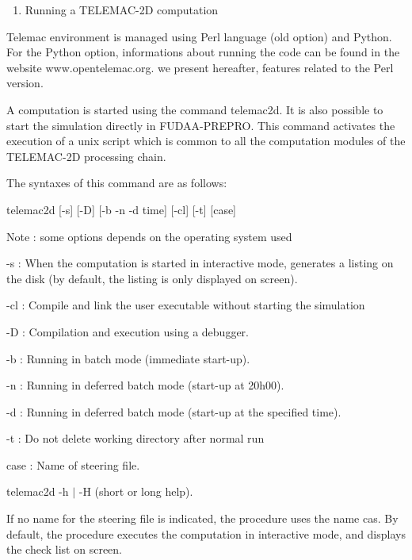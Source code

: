 





\begin{enumerate}
\item   Running a TELEMAC-2D computation
\end{enumerate}



 Telemac environment is managed using Perl language (old option) and Python. For the Python option, informations about running the code can be found in the website www.opentelemac.org. we present hereafter, features related to the Perl version.

 A computation is started using the command telemac2d. It is also possible to start the simulation directly in FUDAA-PREPRO. This command activates the execution of a unix script which is common to all the computation modules of the TELEMAC-2D processing chain.

 The syntaxes of this command are as follows:

 telemac2d [-s] [-D] [-b {\textbar} -n {\textbar} -d time] [-cl] [-t] [case]

 Note : some options depends on the operating system used



 -s : When the computation is started in interactive mode, generates a listing on the disk (by default, the listing is only displayed on screen).

 -cl : Compile and link the user executable without starting the simulation

 -D : Compilation and execution using a debugger.

 -b : Running in batch mode (immediate start-up).

 -n : Running in deferred batch mode (start-up at 20h00).

 -d : Running in deferred batch mode (start-up at the specified time).

 -t : Do not delete working directory after normal run

 case : Name of steering file.



  telemac2d  -h $\mid$ -H  (short or long help).





 If no name for the steering file is indicated, the procedure uses the name cas. By default, the procedure executes the computation in interactive mode, and displays the check list on screen.

